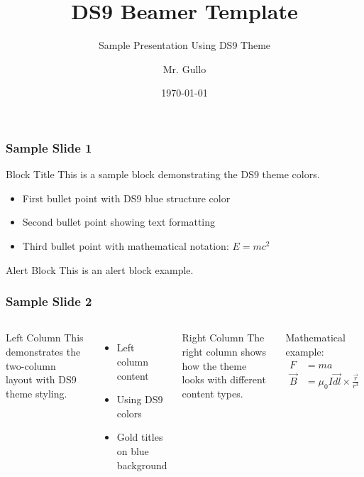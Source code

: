 \documentclass{beamer}
\title[Sample Template]{DS9 Beamer Template}
\subtitle{Sample Presentation Using DS9 Theme}
\author[Mr. Gullo]{Mr. Gullo}
\date[\today]{\today}
\begin{document}
\begin{frame}
\titlepage
\end{frame}

\begin{frame}
\frametitle{Sample Slide 1}
\begin{block}{Block Title}
This is a sample block demonstrating the DS9 theme colors.
\end{block}

\begin{itemize}
\item First bullet point with DS9 blue structure color
\item Second bullet point showing text formatting
\item Third bullet point with mathematical notation: $E = mc^2$
\end{itemize}

\begin{alertblock}{Alert Block}
This is an alert block example.
\end{alertblock}
\end{frame}

\begin{frame}
\frametitle{Sample Slide 2}
\begin{columns}
\begin{block}{Left Column}
This demonstrates the two-column layout with DS9 theme styling.
\end{block}

\begin{itemize}
\item Left column content
\item Using DS9 colors
\item Gold titles on blue background
\end{itemize}

\begin{block}{Right Column}
The right column shows how the theme looks with different content types.
\end{block}

Mathematical example:
\begin{align}
F &= ma \\
\vec{B} &= \mu_0 I \vec{dl} \times \frac{\vec{r}}{r^3}
\end{align}
\end{columns}
\end{frame}
\end{document}
